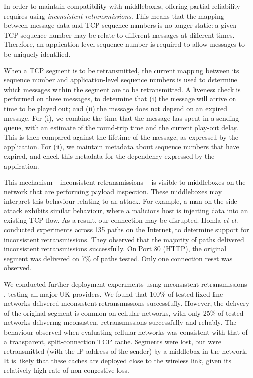 \documentclass[10pt]{sig-alternate-05-2015}
\begin{document}
In order to maintain compatibility with middleboxes, offering partial
reliability requires using \emph{inconsistent retransmissions}. This means
that the mapping between message data and TCP sequence numbers is no longer
static: a given TCP sequence number may be relate to different messages at
different times. Therefore, an application-level sequence number is
required to allow messages to be uniquely identified.

When a TCP segment is to be retransmitted, the current mapping between its
sequence number and application-level sequence numbers is used to determine
which messages within the segment are to be retransmitted. A liveness check
is performed on these messages, to determine that (i) the message will
arrive on time to be played out; and (ii) the message does not depend on an
expired message. For (i), we combine the time that the message has spent in
a sending queue, with an estimate of the round-trip time and the current
play-out delay. This is then compared against the lifetime of the message,
as expressed by the application. For (ii), we maintain metadata about
sequence numbers that have expired, and check this metadata for the
dependency expressed by the application.

This mechanism -- inconsistent retransmissions -- is visible to middleboxes
on the network that are performing payload inspection. These middleboxes
may interpret this behaviour relating to an attack. For example, a
man-on-the-side attack exhibits similar behaviour, where a malicious host
is injecting data into an existing TCP flow. As a result, our connection
may be disrupted. Honda \emph{et al}.\ \cite{honda:2011:extend-tcp} conducted
experiments across 135 paths on the Internet, to determine support for
inconsistent retransmissions. They observed that the majority of paths
delivered inconsistent retransmissions successfully. On Port 80 (HTTP), the
original segment was delivered on 7\% of paths tested. Only one connection
reset was observed.

We conducted further deployment experiments using
inconsistent retransmissions \cite{mcquistin2016hollywood}, testing all
major UK providers. We found that 100\% of tested fixed-line networks
delivered inconsistent retransmissions successfully. However, the delivery
of the original segment is common on cellular networks, with only 25\% of
tested networks delivering inconsistent retransmissions successfully and
reliably. The behaviour observed when evaluating cellular networks was
consistent with that of a transparent, split-connection TCP cache. Segments
were lost, but were retransmitted (with the IP address of the sender) by a
middlebox in the network. It is likely that these caches are deployed close
to the wireless link, given its relatively high rate of non-congestive
loss.
\end{document}
